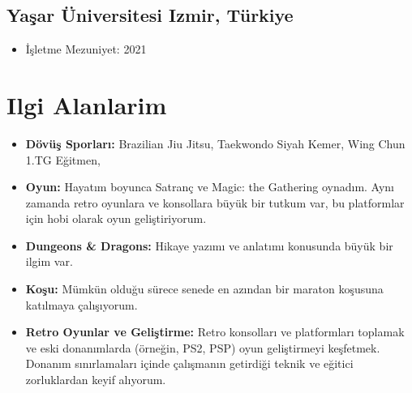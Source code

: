 \documentclass[11pt]{article}
\newcommand{\rside}[1]{
  \hfill {\normalfont\color{accent} #1}%
}
\begin{document}
\subsection{Yaşar Üniversitesi \rside{Izmir, Türkiye}}
\begin{itemize}
    \item{İşletme \rside{Mezuniyet: 2021}}
\end{itemize}
\section{Ilgi Alanlarim}
\begin{itemize}
    \item \textbf{Dövüş Sporları:} Brazilian Jiu Jitsu, Taekwondo Siyah Kemer, Wing Chun 1.TG Eğitmen, 
    \item \textbf{Oyun:} Hayatım boyunca Satranç ve Magic: the Gathering oynadım. Aynı zamanda retro oyunlara ve konsollara büyük bir tutkum var, bu platformlar için hobi olarak oyun geliştiriyorum. 
    \item \textbf{Dungeons \& Dragons:} Hikaye yazımı ve anlatımı konusunda büyük bir ilgim var.
    \item \textbf{Koşu:} Mümkün olduğu sürece senede en azından bir maraton koşusuna katılmaya çalışıyorum.
    \item \textbf{Retro Oyunlar ve Geliştirme:} Retro konsolları ve platformları toplamak ve eski donanımlarda (örneğin, PS2, PSP) oyun geliştirmeyi keşfetmek. Donanım sınırlamaları içinde çalışmanın getirdiği teknik ve eğitici zorluklardan keyif alıyorum.
\end{itemize}
\end{document}
